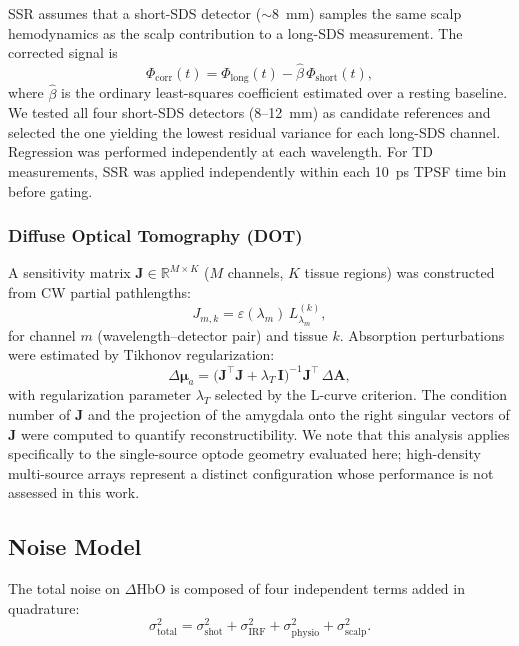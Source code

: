\documentclass[11pt,a4paper]{article}
\begin{document}
SSR assumes that a short-SDS detector ($\sim$8~mm) samples the same scalp hemodynamics as the scalp contribution to a long-SDS measurement\cite{saager2011direct,selb2014improved}. The corrected signal is
\begin{equation}
    \Phi_\mathrm{corr}(t) = \Phi_\mathrm{long}(t) - \hat{\beta}\,\Phi_\mathrm{short}(t),
    \label{eq:ssr}
\end{equation}
where $\hat{\beta}$ is the ordinary least-squares coefficient estimated over a resting baseline. We tested all four short-SDS detectors (8--12~mm) as candidate references and selected the one yielding the lowest residual variance for each long-SDS channel. Regression was performed independently at each wavelength. For TD measurements, SSR was applied independently within each 10~ps TPSF time bin before gating.

\subsubsection*{Diffuse Optical Tomography (DOT)}

A sensitivity matrix $\mathbf{J} \in \mathbb{R}^{M \times K}$ ($M$ channels, $K$ tissue regions) was constructed from CW partial pathlengths:
\begin{equation}
    J_{m,k} = \varepsilon(\lambda_m)\,L_{\lambda_m}^{(k)},
\end{equation}
for channel $m$ (wavelength--detector pair) and tissue $k$. Absorption perturbations were estimated by Tikhonov regularization:
\begin{equation}
    \Delta\bm{\mu}_a = \bigl(\mathbf{J}^\top\mathbf{J} + \lambda_T\,\mathbf{I}\bigr)^{-1}\mathbf{J}^\top\,\Delta\mathbf{A},
    \label{eq:dot}
\end{equation}
with regularization parameter $\lambda_T$ selected by the L-curve criterion. The condition number of $\mathbf{J}$ and the projection of the amygdala onto the right singular vectors of $\mathbf{J}$ were computed to quantify reconstructibility. We note that this analysis applies specifically to the single-source optode geometry evaluated here; high-density multi-source arrays represent a distinct configuration whose performance is not assessed in this work.

\subsection{Noise Model}

The total noise on $\Delta\mathrm{HbO}$ is composed of four independent terms added in quadrature:
\begin{equation}
    \sigma_\mathrm{total}^2 =
    \sigma_\mathrm{shot}^2 + \sigma_\mathrm{IRF}^2 + \sigma_\mathrm{physio}^2 + \sigma_\mathrm{scalp}^2.
    \label{eq:noise}
\end{equation}
\end{document}
